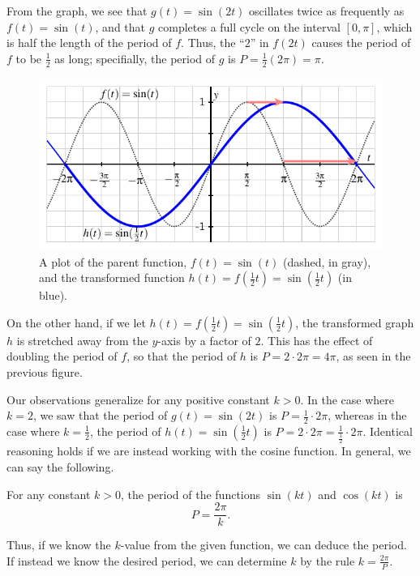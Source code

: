 \documentclass{ximera}
\begin{document}
From the graph, we see that \(g(t) = \sin(2t)\) oscillates twice as frequently as \(f(t) = \sin(t)\), and that \(g\) completes a full cycle on the interval \([0,\pi]\), which is half the length of the period of \(f\).  Thus, the  ``\(2\)'' in \(f(2t)\) causes the period of \(f\) to be \(\frac{1}{2}\) as long; specifially, the period of \(g\) is \(P = \frac{1}{2} (2\pi) = \pi\).%
\begin{figure}
\centering
\includegraphics[width=0.75\linewidth]{images/sinusoidal-sine-horiz-scaling-2}
\caption{A plot of the parent function, \(f(t) = \sin(t)\) (dashed, in gray), and the transformed function \(h(t) = f(\frac{1}{2}t) = \sin(\frac{1}{2}t)\) (in blue).\label{F-sinusoidal-sine-stretched}}
\end{figure}

On the other hand, if we let \(h(t) = f(\frac{1}{2}t) = \sin(\frac{1}{2}t)\), the transformed graph \(h\) is stretched away from the \(y\)-axis by a factor of \(2\).  This has the effect of doubling the period of \(f\), so that the period of \(h\) is \(P = 2 \cdot 2\pi = 4\pi\), as seen in the previous figure.%

Our observations generalize for any positive constant \(k \gt 0\).  In the case where \(k = 2\), we saw that the period of \(g(t) = \sin(2t)\) is \(P = \frac{1}{2} \cdot 2\pi\), whereas in the case where \(k = \frac{1}{2}\), the period of \(h(t) = \sin(\frac{1}{2}t)\) is \(P = 2 \cdot 2\pi = \frac{1}{\frac{1}{2}} \cdot 2\pi\).  Identical reasoning holds if we are instead working with the cosine function.  In general, we can say the following.%

For any constant \(k \gt 0\), the period of the functions \(\sin(kt)\) and \(\cos(kt)\) is%
\[
P = \frac{2\pi}{k}\text{.}
\]
%

Thus, if we know the \(k\)-value from the given function, we can deduce the period.  If instead we know the desired period, we can determine \(k\) by the rule \(k = \frac{2\pi}{P}\).%
\end{document}
